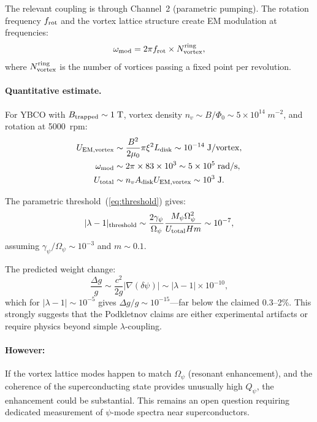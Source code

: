 \documentclass[aps,prd,twocolumn,superscriptaddress,floatfix,nofootinbib]{revtex4-2}
\newcommand{\Opsi}{\Omega_\psi}
\newcommand{\gpsi}{\gamma_\psi}
\newcommand{\Mpsi}{M_\psi}
\newcommand{\lam}{\lambda}
\begin{document}
The relevant coupling is through Channel~2 (parametric pumping). The
rotation frequency $f_{\rm rot}$ and the vortex lattice structure
create EM modulation at frequencies:
\begin{equation}
\omega_{\rm mod} = 2\pi f_{\rm rot} \times N_{\rm vortex}^{\rm ring},
\end{equation}
where $N_{\rm vortex}^{\rm ring}$ is the number of vortices passing
a fixed point per revolution.

\paragraph{Quantitative estimate.}
For YBCO with $B_{\rm trapped} \sim 1\;\si{T}$, vortex density
$n_v \sim B/\Phi_0 \sim 5 \times 10^{14}\;\si{m^{-2}}$, and
rotation at 5000~rpm:
\begin{align}
U_{\rm EM,vortex} &\sim \frac{B^2}{2\mu_0}\pi\xi^2 L_{\rm disk}
\sim 10^{-14}\;\si{J/vortex},\\
\omega_{\rm mod} &\sim 2\pi \times 83 \times 10^3
\sim 5 \times 10^5\;\si{rad/s},\\
U_{\rm total} &\sim n_v A_{\rm disk} U_{\rm EM,vortex}
\sim 10^{3}\;\si{J}.
\end{align}

The parametric threshold~(\ref{eq:threshold}) gives:
\begin{equation}
|\lam-1|_{\rm threshold} \sim
\frac{2\gpsi}{\Opsi}\frac{\Mpsi\Opsi^2}{U_{\rm total}Hm}
\sim 10^{-7},
\end{equation}
assuming $\gpsi/\Opsi \sim 10^{-3}$ and $m \sim 0.1$.

The predicted weight change:
\begin{equation}
\frac{\Delta g}{g} \sim \frac{c^2}{2g}|\nabla(\delta\psi)|
\sim |\lam-1| \times 10^{-10},
\end{equation}
which for $|\lam-1| \sim 10^{-5}$ gives $\Delta g/g \sim 10^{-15}$---far
below the claimed 0.3--2\%. This strongly suggests that the Podkletnov
claims are either experimental artifacts or require physics beyond
simple $\lambda$-coupling.

\paragraph{However:} If the vortex lattice modes happen to match
$\Opsi$ (resonant enhancement), and the coherence of the
superconducting state provides unusually high $Q_\psi$, the
enhancement could be substantial. This remains an open question
requiring dedicated measurement of $\psi$-mode spectra near
superconductors.
\end{document}
